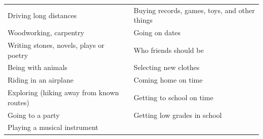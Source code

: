 \documentclass[
]{book}
\begin{document}
\begin{longtable}[]{@{}ll@{}}
\begin{minipage}[t]{0.50\columnwidth}
Driving long distances\strut
\end{minipage} & \begin{minipage}[t]{0.44\columnwidth}\raggedright
Buying records, games, toys, and other things\strut
\end{minipage}\tabularnewline
\begin{minipage}[t]{0.50\columnwidth}\raggedright
Woodworking, carpentry\strut
\end{minipage} & \begin{minipage}[t]{0.44\columnwidth}\raggedright
Going on dates\strut
\end{minipage}\tabularnewline
\begin{minipage}[t]{0.50\columnwidth}\raggedright
Writing stones, novels, plays or poetry\strut
\end{minipage} & \begin{minipage}[t]{0.44\columnwidth}\raggedright
Who friends should be\strut
\end{minipage}\tabularnewline
\begin{minipage}[t]{0.50\columnwidth}\raggedright
Being with animals\strut
\end{minipage} & \begin{minipage}[t]{0.44\columnwidth}\raggedright
Selecting new clothes\strut
\end{minipage}\tabularnewline
\begin{minipage}[t]{0.50\columnwidth}\raggedright
Riding in an airplane\strut
\end{minipage} & \begin{minipage}[t]{0.44\columnwidth}\raggedright
Coming home on time\strut
\end{minipage}\tabularnewline
\begin{minipage}[t]{0.50\columnwidth}\raggedright
Exploring (hiking away from known routes)\strut
\end{minipage} & \begin{minipage}[t]{0.44\columnwidth}\raggedright
Getting to school on time\strut
\end{minipage}\tabularnewline
\begin{minipage}[t]{0.50\columnwidth}\raggedright
Going to a party\strut
\end{minipage} & \begin{minipage}[t]{0.44\columnwidth}\raggedright
Getting low grades in school\strut
\end{minipage}\tabularnewline
\begin{minipage}[t]{0.50\columnwidth}\raggedright
Playing a musical instrument\strut

\end{minipage}
\end{longtable}
\end{document}
